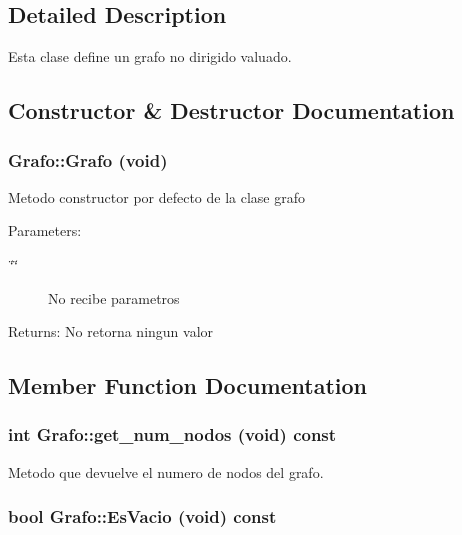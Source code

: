 \subsection{Detailed Description}
Esta clase define un grafo no dirigido valuado. 



\subsection{Constructor \& Destructor Documentation}
\subsubsection{\setlength{\rightskip}{0pt plus 5cm}Grafo::Grafo (void)}\label{classGrafo_d3c8b45fb50abc45e49d42ef78b79ee7}


Metodo constructor por defecto de la clase grafo \begin{Desc}
\item[Parameters:]
\begin{description}
\item[{\em \char`\"{}\char`\"{}}]No recibe parametros \end{description}
\end{Desc}
\begin{Desc}
\item[Returns:]No retorna ningun valor \end{Desc}


\subsection{Member Function Documentation}
\subsubsection{\setlength{\rightskip}{0pt plus 5cm}int Grafo::get\_\-num\_\-nodos (void) const\hspace{0.3cm}{\tt  [inline]}}\label{classGrafo_5321811e9af692715820ae9bd6423637}


Metodo que devuelve el numero de nodos del grafo. 

\subsubsection{\setlength{\rightskip}{0pt plus 5cm}bool Grafo::EsVacio (void) const}\label{classGrafo_00c241c3e011cb2b67e24ee803b30662}


